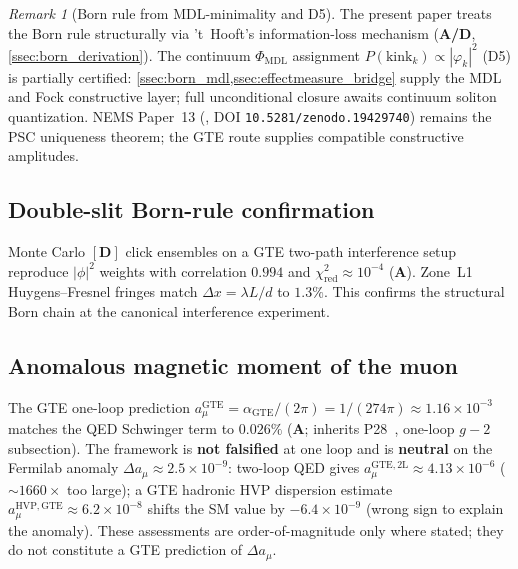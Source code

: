 \documentclass[11pt]{article}
\theoremstyle{remark}
\newtheorem{remark}[theorem]{Remark}
\newcommand{\MDL}{\text{MDL}}
\newcommand{\CatA}{\textbf{A}}
\newcommand{\CatAD}{\textbf{A/D}}
\begin{document}
\begin{remark}[Born rule from MDL-minimality and D5]
\label{rem:born_fwd}
The present paper treats the Born rule structurally via 't~Hooft's
information-loss mechanism (\CatAD{}, \cref{ssec:born_derivation}).
The continuum $\Phi_{\MDL}$ assignment $P(\mathrm{kink}_k) \propto |\varphi_k|^2$ (D5)
is partially certified: \cref{ssec:born_mdl,ssec:effectmeasure_bridge} supply the
MDL and Fock constructive layer; full unconditional closure awaits continuum
soliton quantization.
NEMS Paper~13 (\cite{SpivackBornRule}, DOI \texttt{10.5281/zenodo.19429740}) remains
the PSC uniqueness theorem; the GTE route supplies compatible constructive amplitudes.
\end{remark}

\subsection{Double-slit Born-rule confirmation}
\label{ssec:dslit}

Monte Carlo $[\mathbf{D}]$ click ensembles on a GTE two-path interference setup
reproduce $|\phi|^2$ weights with correlation $0.994$ and
$\chi^2_{\mathrm{red}} \approx 10^{-4}$ (\CatA).
Zone~L1 Huygens--Fresnel fringes match $\Delta x = \lambda L/d$ to $1.3\%$.
This confirms the structural Born chain at the canonical interference experiment.

\subsection{Anomalous magnetic moment of the muon}
\label{ssec:g_minus_2}

The GTE one-loop prediction $a_\mu^{\mathrm{GTE}} = \alpha_{\mathrm{GTE}}/(2\pi)
= 1/(274\pi) \approx 1.16\times 10^{-3}$ matches the QED Schwinger term to
$0.026\%$ (\CatA; inherits P28~\cite{SpivackCompUniversality}, one-loop $g-2$ subsection).
The framework is \textbf{not falsified} at one loop and is \textbf{neutral} on the
Fermilab anomaly $\Delta a_\mu \approx 2.5\times 10^{-9}$:
two-loop QED gives $a_\mu^{\mathrm{GTE,2L}} \approx 4.13\times 10^{-6}$ ($\sim 1660\times$
too large); a GTE hadronic HVP dispersion estimate
$a_\mu^{\mathrm{HVP,GTE}} \approx 6.2\times 10^{-8}$ shifts the SM value by
$-6.4\times 10^{-9}$ (wrong sign to explain the anomaly).
These assessments are order-of-magnitude only where stated; they do not constitute
a GTE prediction of $\Delta a_\mu$.

\end{document}
